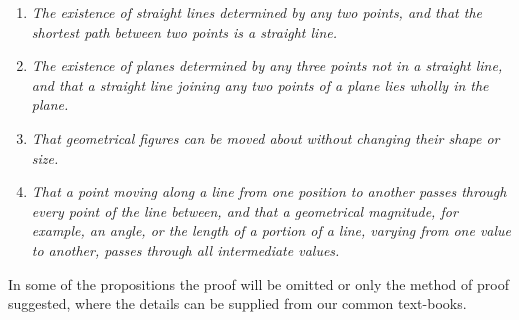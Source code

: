 \begin{enumerate}
\item[I.] \emph{The existence of straight lines determined by any two
points, and that the shortest path between two points is a straight
line.}

\item[II.] \emph{The existence of planes determined by any three points
not in a straight line, and that a straight line joining any two
points of a plane lies wholly in the plane.}

\item[III.] \emph{That geometrical figures can be moved about without
changing their shape or size.}

\item[IV.] \emph{That a point moving along a line from one position
to another passes through every point of the line between, and that
a geometrical magnitude, for example, an angle, or the length of a
portion of a line, varying from one value to another, passes through
all intermediate values.}
\end{enumerate}

In some of the propositions the proof will be omitted or only the
method of proof suggested, where the details can be supplied from
our common text-books.

